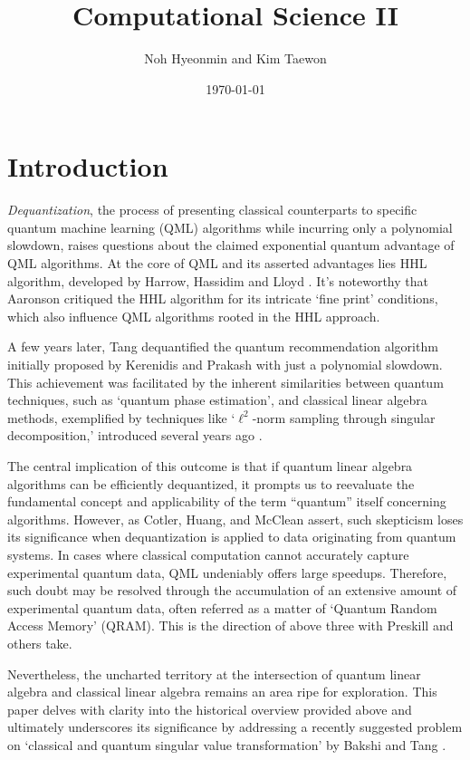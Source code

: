 \documentclass[a4paper,atbegshi]{memoir}
\title{Computational Science II}
\author{Noh Hyeonmin and Kim Taewon}
\date{\today}
\begin{document}
\maketitle\thispagestyle{empty}
\newpage
\tableofcontents
\chapter{Introduction}
\emph{Dequantization}, the process of presenting classical counterparts to 
specific quantum machine learning (QML) algorithms while incurring only a
polynomial slowdown, raises questions about the claimed exponential quantum
advantage of QML algorithms. At the core of QML and its asserted advantages
lies HHL algorithm, developed by Harrow, Hassidim and Lloyd \cite{HHL2009}.
It's noteworthy that Aaronson \cite{Aaronson2015} critiqued the HHL algorithm for
its intricate `fine print' conditions, which also influence QML algorithms
rooted in the HHL approach. 

A few years later, Tang \cite{Tang2019} dequantified the quantum recommendation
algorithm initially proposed by Kerenidis and Prakash \cite{KP2017} with just
a polynomial slowdown. This achievement was facilitated by the inherent
similarities between quantum techniques, such as `quantum phase estimation',
and classical linear algebra methods, exemplified by techniques like 
`$\ell^2$-norm sampling through singular decomposition,' introduced several
years ago \cite{Frieze2004}.

The central implication of this outcome is that if quantum linear algebra
algorithms can be efficiently dequantized, it prompts us to reevaluate the 
fundamental concept and applicability of the term ``quantum'' itself concerning
algorithms. However, as Cotler, Huang, and McClean \cite{Cotler2021} assert,
such skepticism loses its significance when dequantization is applied to data
originating from quantum systems. In cases where classical computation cannot
accurately capture experimental quantum data, QML undeniably offers large
speedups. Therefore, such doubt may be resolved through the accumulation of an
extensive amount of experimental quantum data, often referred as a matter of 
`Quantum Random Access Memory' (QRAM). This is the direction of above three
with Preskill and others \cite{Huang2022} take.

Nevertheless, the uncharted territory at the intersection of quantum linear 
algebra and classical linear algebra remains an area ripe for exploration. This
paper delves with clarity into the historical overview provided above and 
ultimately underscores its significance by addressing a recently suggested 
problem on `classical and quantum singular value transformation' by Bakshi and
Tang \cite{Bakshi2023}.


\end{document}
